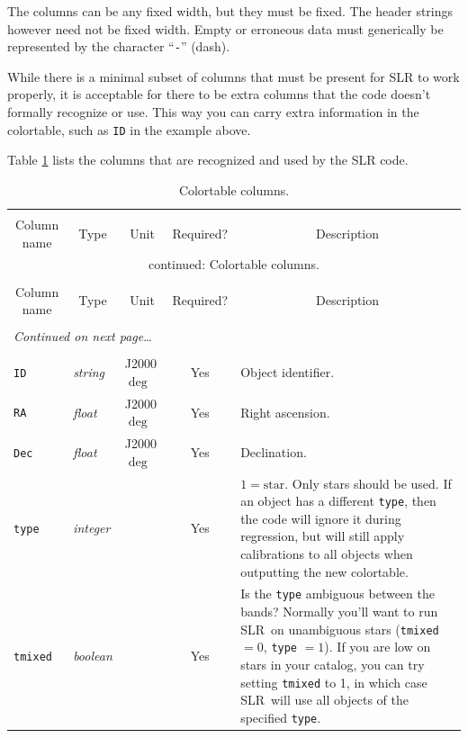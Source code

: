 \documentclass{report}
\newcommand{\slr}{SLR}
\begin{document}
The columns can be any fixed width, but they must be fixed.  The
header strings however need not be fixed width.  Empty or erroneous
data must generically be represented by the character ``\verb|-|''
(dash).

While there is a minimal subset of columns that must be present for
SLR to work properly, it is acceptable for there to be extra columns
that the code doesn't formally recognize or use.  This way you can
carry extra information in the colortable, such as \verb|ID| in the
example above.

Table \ref{tab:colortable} lists the columns that are recognized and
used by the SLR code.

\begin{center}
\begin{longtable}{lllcp{3in}}
\caption[Colortable columns.]{Colortable columns.}
\label{tab:colortable} \\
  \hline \hline \\[-2ex]
  \multicolumn{1}{c}{Column name} &
  \multicolumn{1}{c}{Type} &
  \multicolumn{1}{c}{Unit} &
  \multicolumn{1}{c}{Required?} &
  \multicolumn{1}{c}{Description} \\[0.5ex] \hline
\endfirsthead
\multicolumn{5}{c}{{\tablename} \thetable{} continued: Colortable columns.} \\[0.5ex]
  \hline \hline \\[-2ex]
  \multicolumn{1}{c}{Column name} &
  \multicolumn{1}{c}{Type} &
  \multicolumn{1}{c}{Unit} &
  \multicolumn{1}{c}{Required?} &
  \multicolumn{1}{c}{Description} 
\\[0.5ex] \hline
  \\[-1.8ex]
\endhead
\multicolumn{5}{l}{{{\it Continued on next page}\ldots}} \\
\endfoot
  \\[-1.8ex] \hline \hline
\endlastfoot
\verb|ID| & {\it string} & J2000 $\deg$ & Yes & Object identifier. \\
\verb|RA| & {\it float} & J2000 $\deg$ & Yes & Right ascension. \\
\verb|Dec| & {\it float} & J2000 $\deg$ & Yes & Declination. \\
\verb|type| & {\it integer} & & Yes & $1=\textrm{star}$. Only stars should be used. If an object has a different \verb|type|, then the code will ignore it during regression, but will still apply calibrations to all objects when outputting the new colortable. \\
\verb|tmixed| & {\it boolean} & & Yes & Is the \verb|type| ambiguous between the bands? Normally you'll want to run \slr\ on unambiguous stars (\verb|tmixed| $=0$, \verb|type| $=1$). If you are low on stars in your catalog, you can try setting \verb|tmixed| to 1, in which case \slr\ will use all objects of the specified \verb|type|. \\

\end{longtable}
\end{center}
\end{document}
